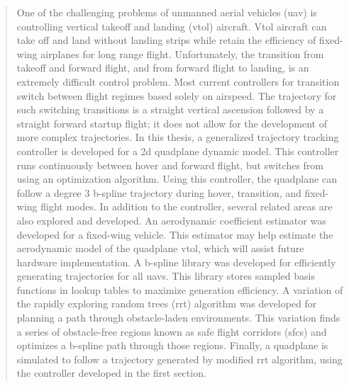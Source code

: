 \begin{abstract}  
    One of the challenging problems of unmanned aerial vehicles (uav) is controlling vertical takeoff and landing (vtol) aircraft.
    Vtol aircraft can take off and land without landing strips while retain the efficiency of fixed-wing airplanes for long range flight.
    Unfortunately, the transition from takeoff and forward flight, and from forward flight to landing, is an extremely difficult control problem.
    Most current controllers for transition switch between flight regimes based solely on airspeed.
    The trajectory for such switching transitions is a straight vertical ascension followed by a straight forward startup flight; it does not allow for the development of more complex trajectories.
    In this thesis, a generalized trajectory tracking controller is developed for a 2d quadplane dynamic model.
    This controller runs continuously between hover and forward flight, but switches from  using an optimization algorithm.
    Using this controller, the quadplane can follow a degree 3 b-spline trajectory during hover, transition, and fixed-wing flight modes.
    In addition to the controller, several related areas are also explored and developed.
    An aerodynamic coefficient estimator was developed for a fixed-wing vehicle. 
    This estimator may help estimate the aerodynamic model of the quadplane vtol, which will assist future hardware implementation.
    A b-spline library was developed for efficiently generating trajectories for all uavs.
    This library stores sampled basis functions in lookup tables to maximize generation efficiency.
    A variation of the rapidly exploring random trees (rrt) algorithm was developed for planning a path through obstacle-laden environments.
    This variation finds a series of obstacle-free regions known as safe flight corridors (sfcs) and optimizes a b-spline path through those regions.
    Finally, a quadplane is simulated to follow a trajectory generated by modified rrt algorithm, using the controller developed in the first section.
\end{abstract}
